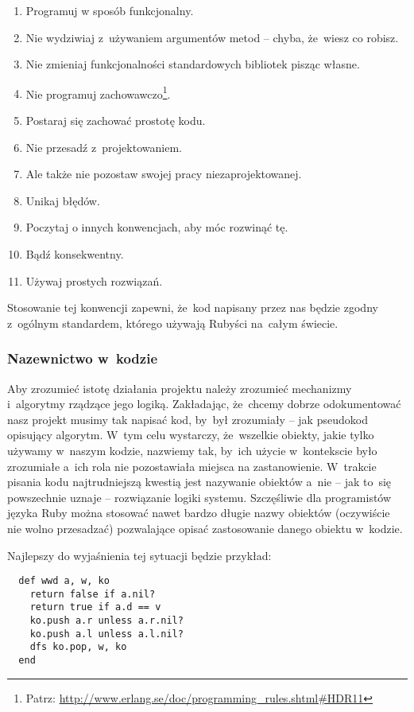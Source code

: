 \begin{enumerate}
\begin{enumerate}
    \item Programuj w sposób funkcjonalny.
    \item Nie wydziwiaj z~używaniem argumentów metod -- chyba, że~wiesz co robisz.
    \item Nie zmieniaj funkcjonalności standardowych bibliotek pisząc własne.
    \item Nie programuj zachowawczo\footnote{Patrz: \url{http://www.erlang.se/doc/programming\_rules.shtml\#HDR11}}.
    \item Postaraj się zachować prostotę kodu.
    \item Nie przesadź z~projektowaniem.
    \item Ale także nie pozostaw swojej pracy niezaprojektowanej.
    \item Unikaj błędów.
    \item Poczytaj o innych konwencjach, aby móc rozwinąć tę.
    \item Bądź konsekwentny.
    \item Używaj prostych rozwiązań.
  \end{enumerate}
\end{enumerate}

Stosowanie tej konwencji zapewni, że~kod napisany przez nas będzie zgodny z~ogólnym standardem, którego używają Rubyści na~całym świecie.

\subsubsection{Nazewnictwo w~kodzie} \label{dokumentacja.nazewnictwo}

Aby zrozumieć istotę działania projektu należy zrozumieć mechanizmy i~algorytmy rządzące jego logiką. Zakładając, że~chcemy dobrze odokumentować nasz projekt musimy tak napisać kod, by~był zrozumiały -- jak pseudokod opisujący algorytm. W~tym celu wystarczy, że~wszelkie obiekty, jakie tylko używamy w~naszym kodzie, nazwiemy tak, by~ich użycie w~kontekscie było zrozumiałe a~ich rola nie pozostawiała miejsca na zastanowienie. W~trakcie pisania kodu najtrudniejszą kwestią jest nazywanie obiektów a~nie -- jak to~się powszechnie uznaje -- rozwiązanie logiki systemu. Szczęśliwie dla programistów języka Ruby można stosować nawet bardzo długie nazwy obiektów (oczywiście nie wolno przesadzać) pozwalające opisać zastosowanie danego obiektu w~kodzie.


Najlepszy do wyjaśnienia tej sytuacji będzie przykład:

  \begin{lstlisting}
  def wwd a, w, ko
    return false if a.nil?
    return true if a.d == v
    ko.push a.r unless a.r.nil?
    ko.push a.l unless a.l.nil?
    dfs ko.pop, w, ko
  end
  \end{lstlisting}

